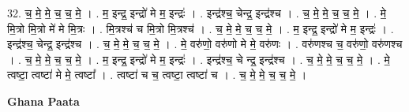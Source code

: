\documentclass[17pt]{extarticle}
\begin{document}
32. च॒ मे॒ मे॒ च॒ च॒ मे॒ । . म॒ इन्द्र॒ इन्द्रो॑ मे म॒ इन्द्रः॑ । . इन्द्र॑श्च॒ चेन्द्र॒ इन्द्र॑श्च । . च॒ मे॒ मे॒ च॒ च॒ मे॒ । . मे॒ मि॒त्रो मि॒त्रो मे॑ मे मि॒त्रः । . मि॒त्रश्च॑ च मि॒त्रो मि॒त्रश्च॑ । . च॒ मे॒ मे॒ च॒ च॒ मे॒ । . म॒ इन्द्र॒ इन्द्रो॑ मे म॒ इन्द्रः॑ । . इन्द्र॑श्च॒ चेन्द्र॒ इन्द्र॑श्च । . च॒ मे॒ मे॒ च॒ च॒ मे॒ । . मे॒ वरु॑णो॒ वरु॑णो मे मे॒ वरु॑णः । . वरु॑णश्च च॒ वरु॑णो॒ वरु॑णश्च । . च॒ मे॒ मे॒ च॒ च॒ मे॒ । . म॒ इन्द्र॒ इन्द्रो॑ मे म॒ इन्द्रः॑ । . इन्द्र॑श्च॒ चे न्द्र॒ इन्द्र॑श्च । . च॒ मे॒ मे॒ च॒ च॒ मे॒ । . मे॒ त्वष्टा॒ त्वष्टा॑ मे मे॒ त्वष्टा᳚ । . त्वष्टा॑ च च॒ त्वष्टा॒ त्वष्टा॑ च । . च॒ मे॒ मे॒ च॒ च॒ मे॒ । \newline

\textbf{Ghana Paata } \newline
\end{document}
